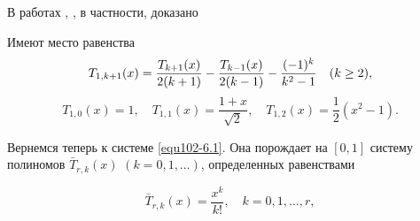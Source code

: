 В работах \cite{equ102-Shar20}, \cite{equ102-Shar25}, в частности, доказано
\begin{corollary} Имеют место равенства
\begin{equation}\label{equ102-6.8}
T_{1,k+1}(x)={T_{k+1}(x)\over2(k+1)}- {T_{k-1}(x)\over2(k-1)} -\frac{(-1)^k}{k^2-1}\quad (k\ge 2),
\end{equation}
\begin{equation}\label{equ102-6.9}
T_{1,0}(x)=1, \quad T_{1,1}(x)=\frac{1+x}{\sqrt{2}}, \quad T_{1,2}(x)=\frac12(x^2-1).
\end{equation}
\end{corollary}
 Вернемся теперь к системе \eqref{equ102-6.1}. Она порождает на $[0,1]$ систему полиномов $\bar T_{r,k}(x)$ $(k=0,1,\ldots)$, определенных равенствами

  \begin{equation}\label{equ102-6.10}
\bar T_{r,k}(x) =\frac{x^k}{k!}, \quad k=0,1,\ldots, r,
\end{equation}


